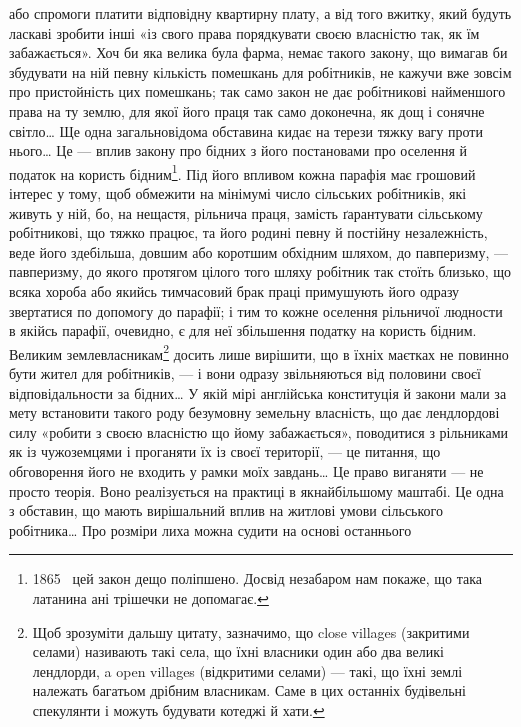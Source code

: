 \parcont{}  %
або спромоги платити відповідну квартирну плату, а від того
вжитку, який будуть ласкаві зробити інші «із свого права порядкувати
своєю власністю так, як їм забажається». Хоч би яка
велика була фарма, немає такого закону, що вимагав би збудувати
на ній певну кількість помешкань для робітників, не кажучи
вже зовсім про пристойність цих помешкань; так само
закон не дає робітникові найменшого права на ту землю, для якої
його праця так само доконечна, як дощ і сонячне світло\dots{} Ще
одна загальновідома обставина кидає на терези тяжку вагу проти
нього\dots{} Це — вплив закону про бідних з його постановами про
оселення й податок на користь бідним\footnote{
1865~ цей закон дещо поліпшено. Досвід незабаром нам покаже,
що така латанина ані трішечки не допомагає.
}. Під його впливом кожна
парафія має грошовий інтерес у тому, щоб обмежити на мінімумі
число сільських робітників, які живуть у ній, бо, на нещастя,
рільнича праця, замість ґарантувати сільському робітникові,
що тяжко працює, та його родині певну й постійну незалежність,
веде його здебільша, довшим або коротшим обхідним
шляхом, до павперизму, — павперизму, до якого протягом цілого
того шляху робітник так стоїть близько, що всяка хороба
або якийсь тимчасовий брак праці примушують його одразу звертатися
по допомогу до парафії; і тим то кожне оселення рільничої
людности в якійсь парафії, очевидно, є для неї збільшення
податку на користь бідним. Великим землевласникам\footnote{
Щоб зрозуміти дальшу цитату, зазначимо, що close villages (закритими
селами) називають такі села, що їхні власники один
або два великі лендлорди, a open villages (відкритими селами) — такі,
що їхні землі належать багатьом дрібним власникам. Саме в цих останніх
будівельні спекулянти і можуть будувати котеджі й хати.
} досить
лише вирішити, що в їхніх маєтках не повинно бути жител для
робітників, — і вони одразу звільняються від половини своєї
відповідальности за бідних\dots{} У якій мірі англійська конституція
й закони мали за мету встановити такого роду безумовну
земельну власність, що дає лендлордові силу «робити з своєю
власністю що йому забажається», поводитися з рільниками
як із чужоземцями і проганяти їх із своєї території, — це питання,
що обговорення його не входить у рамки моїх завдань\dots{}
Це право виганяти — не просто теорія. Воно реалізується
на практиці в якнайбільшому маштабі. Це одна з обставин, що
мають вирішальний вплив на житлові умови сільського робітника\dots{}
Про розміри лиха можна судити на основі останнього
